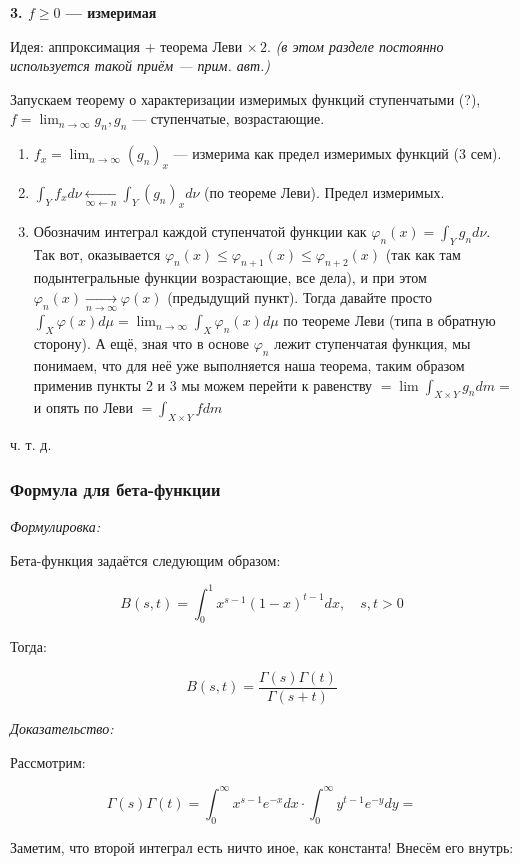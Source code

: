 \documentclass{article}
\def\goesto#1{\underset{#1}{\longrightarrow}}
\def\toinf#1{\goesto{#1 \rightarrow \infty}}
\def\ntoinf{\toinf{n}}
\begin{document}
\textbf{3. $f \ge 0$ --- измеримая}

Идея: аппроксимация + теорема Леви $\times \, 2$. \textit{(в этом разделе постоянно используется такой приём --- прим. авт.)}

Запускаем теорему о характеризации измеримых функций ступенчатыми (?), $f = \lim_{n \rightarrow \infty} g_n, g_n$ --- ступенчатые, возрастающие.

\begin{enumerate}
    \item $f_x = \lim_{n \rightarrow \infty} (g_n)_x$ --- измерима как предел измеримых функций (3 сем).
    \item $\int_{Y} f_x d\nu \underset{\infty \leftarrow n}{\longleftarrow} \int_{Y} (g_n)_x d\nu$ (по теореме Леви). Предел измеримых.
    \item Обозначим интеграл каждой ступенчатой функции как $\varphi_n(x) = \int_{Y} g_n d\nu$. Так вот, оказывается $\varphi_n(x) \le \varphi_{n + 1}(x) \le \varphi_{n + 2}(x)$ (так как там подынтегральные функции возрастающие, все дела), и при этом $\varphi_n(x) \ntoinf \varphi(x)$ (предыдущий пункт). Тогда давайте просто $\int_{X} \varphi(x) d\mu = \lim_{n \rightarrow \infty} \int_{X} \varphi_n(x) d\mu$ по теореме Леви (типа в обратную сторону). А ещё, зная что в основе $\varphi_n$ лежит ступенчатая функция, мы понимаем, что для неё уже выполняется наша теорема, таким образом применив пункты 2 и 3 мы можем перейти к равенству $= \lim \int_{X \times Y} g_n dm = $ и опять по Леви $ = \int_{X \times Y} fdm$
\end{enumerate}

ч. т. д. 

\subsubsection{Формула для бета-функции}
\textit{Формулировка:}

Бета-функция задаётся следующим образом: 

\[B(s, t) = \int_{0}^{1}x^{s - 1}(1 - x)^{t - 1}dx, \quad s, t > 0\]

Тогда:

\[B(s, t) = \frac{\Gamma(s)\Gamma(t)}{\Gamma(s + t)}\]

\textit{Доказательство:}

Рассмотрим:

\[\Gamma(s)\Gamma(t) = \int_{0}^{\infty}x^{s - 1}e^{-x}dx \cdot \int_{0}^{\infty} y^{t - 1}e^{-y} dy = \]

Заметим, что второй интеграл есть ничто иное, как константа! Внесём его внутрь:
\end{document}
